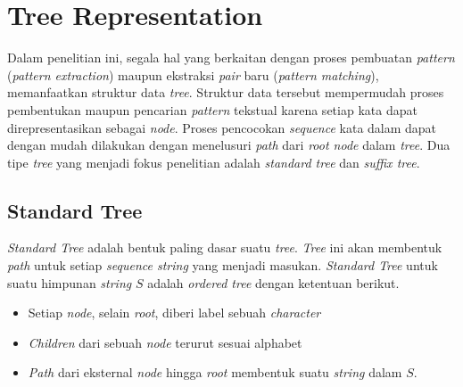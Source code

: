 \section{Tree Representation} 
Dalam penelitian ini, segala hal yang berkaitan dengan proses pembuatan \textit{pattern} (\textit{pattern extraction}) maupun ekstraksi \textit{pair} baru (\textit{pattern matching}), memanfaatkan struktur data \textit{tree}. Struktur data tersebut mempermudah proses pembentukan maupun pencarian \textit{pattern} tekstual karena setiap kata dapat direpresentasikan sebagai \textit{node}. Proses pencocokan \textit{sequence} kata dalam dapat dengan mudah dilakukan dengan menelusuri \textit{path} dari \textit{root node} dalam \textit{tree}. Dua tipe \textit{tree} yang menjadi fokus penelitian adalah \textit{standard tree} dan \textit{suffix tree}.

\subsection{Standard Tree} \label{sec:tree}
\textit{Standard Tree} adalah bentuk paling dasar suatu \textit{tree}. \textit{Tree} ini akan membentuk \textit{path} untuk setiap \textit{sequence string} yang menjadi masukan. \textit{Standard Tree} untuk suatu himpunan \textit{string} $S$ adalah \textit{ordered tree} dengan ketentuan berikut.
\begin{itemize}
  \item Setiap \textit{node}, selain \textit{root}, diberi label sebuah \textit{character}
  \item \textit{Children} dari sebuah \textit{node} terurut sesuai alphabet
  \item \textit{Path} dari eksternal \textit{node} hingga \textit{root} membentuk suatu \textit{string} dalam $S$.
\end{itemize}

